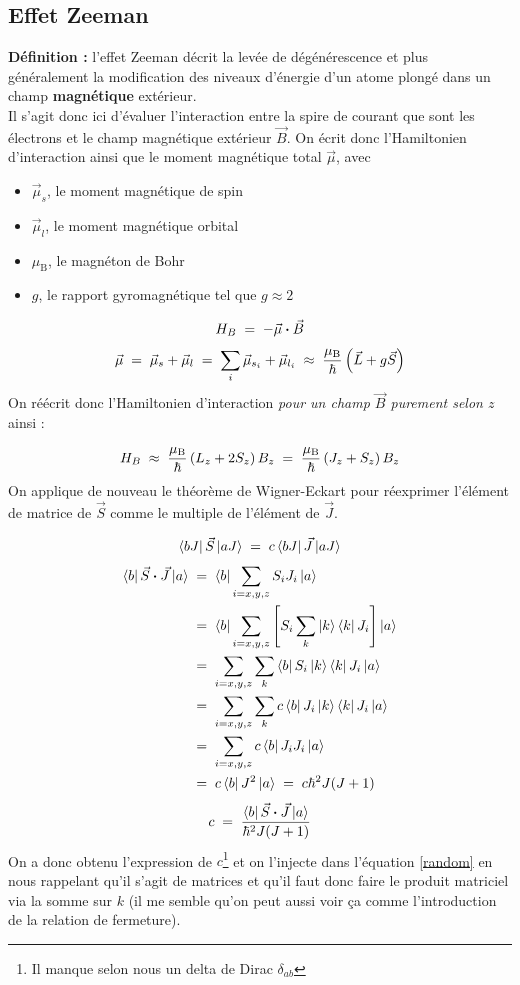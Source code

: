 \subsection{Effet Zeeman}



\textbf{Définition :} l'effet Zeeman décrit la levée de dégénérescence et plus généralement la modification des niveaux d'énergie d'un atome plongé dans un champ \textbf{magnétique} extérieur.\\
Il s'agit donc ici d'évaluer l'interaction entre la spire de courant que sont les électrons et le champ magnétique extérieur $\vec{B}$. On écrit donc l'Hamiltonien d'interaction ainsi que le moment magnétique total $\vec{\mu}$, avec
\begin{itemize}[label=$\bullet$]
    \item $\vec{\mu}_{s}$, le moment magnétique de spin
    \item $\vec{\mu}_{l}$, le moment magnétique orbital
    \item $\mu_\text{B}$, le magnéton de Bohr
    \item $g$, le rapport gyromagnétique tel que $g \approx 2$
\end{itemize}

\[
    H_B \; = \; -\vec{\mu} \boldsymbol{\cdot} \vec{B}
\]
\[
    \vec{\mu} \; = \; \vec{\mu}_{s} + \vec{\mu}_{l} \; = \; \sum_i \vec{\mu}_{s_i} + \vec{\mu}_{l_i} \; \approx \; \dfrac{\mu_\text{B}}{\hbar}\left( \vec{L} + g\vec{S}\right)
\]
On réécrit donc l'Hamiltonien d'interaction \emph{pour un champ $\vec{B}$ purement selon $z$} ainsi :

\[
    H_B \;\approx\; \dfrac{\mu_\text{B}}{\hbar}\left( L_z + 2 S_z\right)B_z \; = \; \dfrac{\mu_\text{B}}{\hbar}\left( J_z + S_z\right)B_z
\]
On applique de nouveau le théorème de Wigner-Eckart pour réexprimer l'élément de matrice de $\vec{S}$ comme le multiple de l'élément de $\vec{J}$.

\begin{equation}
    \bra{bJ}\vec{S}\ket{aJ} \; = \; c \bra{bJ}\vec{J}\ket{aJ}
    \label{random}
\end{equation}
\begin{align*}
    \bra{b}\vec{S}\boldsymbol{\cdot}\vec{J}\ket{a}
    &\; = \;
    \bra{b} \sum_{i=x,y,z}S_i J_i\ket{a} \\
    &\; = \;
    \bra{b} \sum_{i=x,y,z} \left[ S_i \sum_k \ket{k}\bra{k} J_i \right] \ket{a} \\
    &\; = \;
    \sum_{i=x,y,z} \sum_k \bra{b}S_i\ket{k} \bra{k}J_i\ket{a} \\
    &\; = \;
    \sum_{i=x,y,z} \sum_k c\bra{b}J_i\ket{k} \bra{k}J_i\ket{a} \\
    &\; = \;
    \sum_{i=x,y,z} c\bra{b}J_iJ_i\ket{a} \\
    &\; = \;
    c\bra{b}J^2\ket{a} \; = \; c \hbar^2 J(J+1)
\end{align*}
\[
    c \; = \; \dfrac{\bra{b}\vec{S}\boldsymbol{\cdot}\vec{J}\ket{a}}{\hbar^2 J(J+1)}
\]
On a donc obtenu l'expression de $c$\footnote{Il manque selon nous un delta de Dirac $\delta_{ab}$} et on l'injecte dans l'équation \ref{random} en nous rappelant qu'il s'agit de matrices et qu'il faut donc faire le produit matriciel via la somme sur $k$ (il me semble qu'on peut aussi voir ça comme l'introduction de la relation de fermeture).

